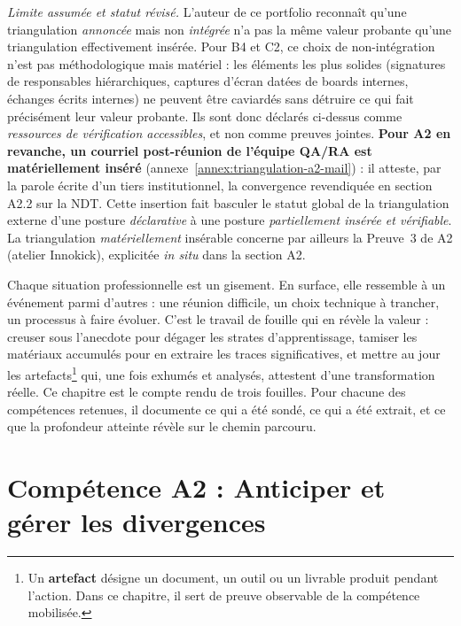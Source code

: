 \begin{tcolorbox}
\textit{Limite assumée et statut révisé.} L'auteur de ce portfolio reconnaît qu'une triangulation \emph{annoncée} mais non \emph{intégrée} n'a pas la même valeur probante qu'une triangulation effectivement insérée. Pour B4 et C2, ce choix de non-intégration n'est pas méthodologique mais matériel : les éléments les plus solides (signatures de responsables hiérarchiques, captures d'écran datées de boards internes, échanges écrits internes) ne peuvent être caviardés sans détruire ce qui fait précisément leur valeur probante. Ils sont donc déclarés ci-dessus comme \emph{ressources de vérification accessibles}, et non comme preuves jointes. \textbf{Pour A2 en revanche, un courriel post-réunion de l'équipe QA/RA est matériellement inséré} (annexe~\ref{annex:triangulation-a2-mail}) : il atteste, par la parole écrite d'un tiers institutionnel, la convergence revendiquée en section A2.2 sur la NDT. Cette insertion fait basculer le statut global de la triangulation externe d'une posture \emph{déclarative} à une posture \emph{partiellement insérée et vérifiable}. La triangulation \emph{matériellement} insérable concerne par ailleurs la Preuve~3 de A2 (atelier Innokick), explicitée \emph{in situ} dans la section A2.
\end{tcolorbox}

\bigskip

Chaque situation professionnelle est un gisement. En surface, elle ressemble à un événement parmi d'autres : une réunion difficile, un choix technique à trancher, un processus à faire évoluer. C'est le travail de fouille qui en révèle la valeur : creuser sous l'anecdote pour dégager les strates d'apprentissage, tamiser les matériaux accumulés pour en extraire les traces significatives, et mettre au jour les artefacts\footnote{Un \textbf{artefact} désigne un document, un outil ou un livrable produit pendant l'action. Dans ce chapitre, il sert de preuve observable de la compétence mobilisée.} qui, une fois exhumés et analysés, attestent d'une transformation réelle. Ce chapitre est le compte rendu de trois fouilles. Pour chacune des compétences retenues, il documente ce qui a été sondé, ce qui a été extrait, et ce que la profondeur atteinte révèle sur le chemin parcouru.

\section{Compétence A2 : Anticiper et gérer les divergences}
\label{sec:competence-a2}


